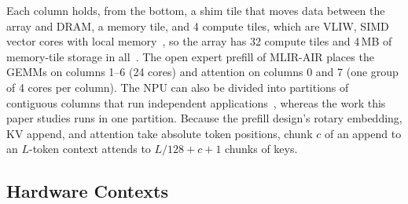 Each column holds, from the bottom, a shim tile that moves data between the array and DRAM, a memory tile, and 4 compute tiles, which are VLIW, SIMD vector cores with local memory~\citep{amd_am027,linux-amdnpu}, so the array has 32 compute tiles and 4\,MB of memory-tile storage in all~\citep{linux-amdnpu}.
The open expert prefill of MLIR-AIR places the GEMMs on columns 1--6 (24 cores) and attention on columns 0 and 7 (one group of 4 cores per column).
The NPU can also be divided into partitions of contiguous columns that run independent applications~\citep{rico2024xdna}, whereas the work this paper studies runs in one partition.
Because the prefill design's rotary embedding, KV append, and attention take absolute token positions, chunk $c$ of an append to an $L$-token context attends to $L/128 + c + 1$ chunks of keys.

\subsection{Hardware Contexts}
\label{app:contexts}

